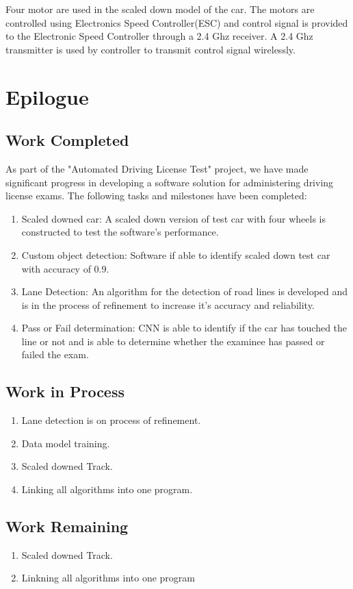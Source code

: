 Four motor are used in the scaled down model of the car. The motors are controlled using Electronics Speed Controller(ESC) and control signal is provided to the Electronic Speed Controller through a 2.4 Ghz receiver. A 2.4 Ghz transmitter is used by controller to transmit control signal wirelessly. 

\chapter{Epilogue}

\section{Work Completed}
As part of the "Automated Driving License Test" project, we have made significant progress in developing a software solution for administering driving license exams. The following tasks and milestones have been completed:
\begin{enumerate}
\item Scaled downed car: A scaled down version of test car with four wheels is constructed to test the software's performance.  
\item Custom object detection: Software if able to identify scaled down test car with accuracy of 0.9.
\item Lane Detection: An algorithm for the detection of road lines is developed and is in the process of refinement to increase it's accuracy and 	reliability. 
\item Pass or Fail determination: CNN is able to identify if the car has touched the line or not and is able to determine whether the examinee has passed or failed the exam. 
\end{enumerate}


\section{Work in Process}
\begin{enumerate}
\item Lane detection is on process of refinement.
\item Data model training.
\item Scaled downed Track.
\item Linking all algorithms into one program.
\end{enumerate}

\section{Work Remaining}
\begin{enumerate}
\item Scaled downed Track.
\item Linkning all algorithms into one program
\end{enumerate}
   

